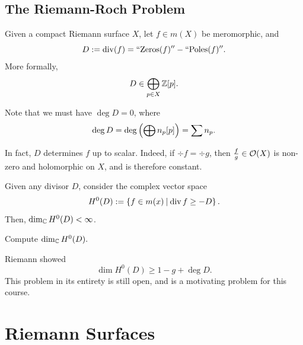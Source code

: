 \documentclass[11pt]{article}
\begin{document}
\subsection{The Riemann-Roch Problem}

Given a compact Riemann surface $X$, let $f \in m(X)$ be meromorphic, and
$$D:=\div (f) = \text{``Zeros}(f)'' - ``\text{Poles}(f)''.$$
More formally,
$$D \in \bigoplus_{p \in X}\Z[p].$$

Note that we must have $\deg D=0$, where
$$\deg D = \deg \paren{\bigoplus n_p[p]}=\sum n_p.$$

In fact, $D$ determines $f$ up to scalar. Indeed, if $\div f = \div g$, then $\frac{f}{g} \in \mc O(X)$ is non-zero and holomorphic on $X$, and is therefore constant.

\begin{notethm*}
    Given any divisor $D$, consider the complex vector space 
    $$H^0(D) := \brax{ f \in m(x) \setbar \div f \geq -D }.$$
    Then, $\dim_\C H^0(D) < \infty$.
\end{notethm*}

\begin{notethm*}
    Compute $\dim_\C H^0(D).$
\end{notethm*}
Riemann showed
$$\dim H^0(D) \geq 1-g+\deg D.$$
This problem in its entirety is still open, and is a motivating problem for this course.

\section{Riemann Surfaces}
\end{document}

